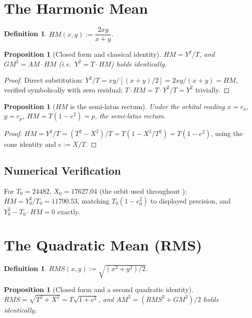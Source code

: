 \documentclass[12pt]{amsart}
\theoremstyle{plain}
\newtheorem{proposition}[theorem]{Proposition}
\newtheorem{definition}[theorem]{Definition}
\theoremstyle{remark}
\begin{document}
\section{The Harmonic Mean}

\begin{definition}
$HM(x,y):=\dfrac{2xy}{x+y}$.
\end{definition}

\begin{proposition}[Closed form and classical identity]\label{prop:HM}
$HM=Y^2/T$, and $GM^2=AM\cdot HM$ (i.e.\ $Y^2=T\cdot HM$) holds identically.
\end{proposition}

\begin{proof}
Direct substitution: $Y^2/T=xy/[(x+y)/2]=2xy/(x+y)=HM$, verified symbolically with zero residual; $T\cdot HM=T\cdot Y^2/T=Y^2$ trivially.
\end{proof}

\begin{proposition}[$HM$ is the semi-latus rectum]\label{prop:HMorbital}
Under the orbital reading $x=r_a$, $y=r_p$, $HM=T(1-e^2)=p$, the semi-latus rectum.
\end{proposition}

\begin{proof}
$HM=Y^2/T=(T^2-X^2)/T=T(1-X^2/T^2)=T(1-e^2)$, using the cone identity and $e:=X/T$.
\end{proof}

\subsection*{Numerical Verification}
For $T_0=24482$, $X_0=17627.04$ (the orbit used throughout \cite{Ebert2026Clock,Ebert2026LeviCivita}): $HM=Y_0^2/T_0=11790.53$, matching $T_0(1-e_0^2)$ to displayed precision, and $Y_0^2-T_0\cdot HM=0$ exactly.

\section{The Quadratic Mean (RMS)}

\begin{definition}
$RMS(x,y):=\sqrt{(x^2+y^2)/2}$.
\end{definition}

\begin{proposition}[Closed form and a second quadratic identity]\label{prop:RMS}
$RMS=\sqrt{T^2+X^2}=T\sqrt{1+e^2}$, and $AM^2=(RMS^2+GM^2)/2$ holds identically.
\end{proposition}
\end{document}
